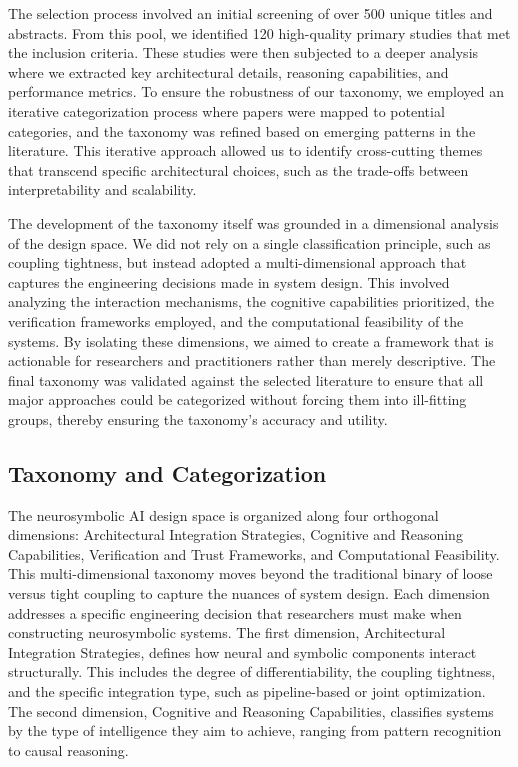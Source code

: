 \documentclass{article}
\begin{document}
The selection process involved an initial screening of over 500 unique titles and abstracts. From this pool, we identified 120 high-quality primary studies that met the inclusion criteria. These studies were then subjected to a deeper analysis where we extracted key architectural details, reasoning capabilities, and performance metrics. To ensure the robustness of our taxonomy, we employed an iterative categorization process where papers were mapped to potential categories, and the taxonomy was refined based on emerging patterns in the literature. This iterative approach allowed us to identify cross-cutting themes that transcend specific architectural choices, such as the trade-offs between interpretability and scalability.

The development of the taxonomy itself was grounded in a dimensional analysis of the design space. We did not rely on a single classification principle, such as coupling tightness, but instead adopted a multi-dimensional approach that captures the engineering decisions made in system design. This involved analyzing the interaction mechanisms, the cognitive capabilities prioritized, the verification frameworks employed, and the computational feasibility of the systems. By isolating these dimensions, we aimed to create a framework that is actionable for researchers and practitioners rather than merely descriptive. The final taxonomy was validated against the selected literature to ensure that all major approaches could be categorized without forcing them into ill-fitting groups, thereby ensuring the taxonomy's accuracy and utility.

\subsection{Taxonomy and Categorization}

\label{sec:taxonomy_and_categorization}

The neurosymbolic AI design space is organized along four orthogonal dimensions: Architectural Integration Strategies, Cognitive and Reasoning Capabilities, Verification and Trust Frameworks, and Computational Feasibility. This multi-dimensional taxonomy moves beyond the traditional binary of loose versus tight coupling to capture the nuances of system design. Each dimension addresses a specific engineering decision that researchers must make when constructing neurosymbolic systems. The first dimension, Architectural Integration Strategies, defines how neural and symbolic components interact structurally. This includes the degree of differentiability, the coupling tightness, and the specific integration type, such as pipeline-based or joint optimization. The second dimension, Cognitive and Reasoning Capabilities, classifies systems by the type of intelligence they aim to achieve, ranging from pattern recognition to causal reasoning.
\end{document}
